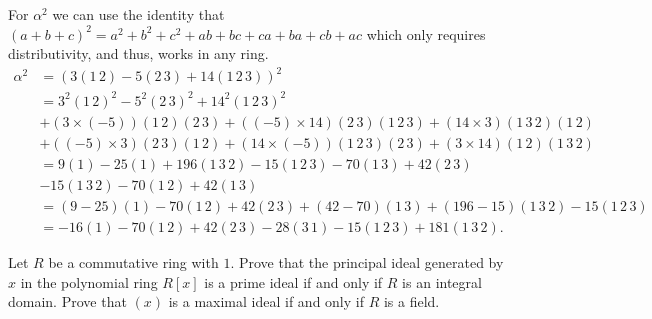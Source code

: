 \documentclass[12 pt, letterpaper]{hmcpset}
\begin{document}
\begin{solution}
\begin{enumerate}
			For $\alpha^{2}$ we can use the identity that $(a + b + c)^{2} = a^{2} + b^{2} + c^{2} + ab + bc + ca + ba + cb + ac$ which only requires distributivity, and thus, works in any ring.
			\[
				\begin{split}
					\alpha^{2} & = (3 (1 \, 2) - 5 (2 \, 3) + 14 (1 \, 2 \, 3))^{2} \\
						   & = 3^{2} (1 \, 2)^{2} - 5^{2} (2 \, 3)^{2} + 14^{2} (1 \, 2 \, 3)^{2} \\ 
						   & + (3 \times (-5))(1 \, 2)(2 \, 3) + ((-5) \times 14) (2 \, 3) (1 \, 2 \, 3) + (14 \times 3) (1 \, 3 \, 2)(1 \, 2) \\
						   & + ((-5) \times 3)(2 \, 3)(1 \, 2) + (14 \times (-5))(1 \, 2 \, 3)(2 \, 3) + (3 \times 14)(1 \, 2)(1 \, 3 \, 2) \\
						   & = 9 (1) - 25 (1) + 196 (1 \, 3 \, 2) - 15 (1 \, 2 \, 3) - 70 (1 \, 3) + 42 (2 \, 3) \\
						   & - 15 (1 \, 3 \, 2) - 70 (1 \, 2) + 42 (1 \, 3) \\
						   & = (9 - 25) (1) - 70 (1 \, 2) + 42(2 \, 3) + (42 - 70) (1 \, 3) + (196 - 15)(1 \, 3 \, 2) - 15 (1 \, 2 \, 3) \\
						   & = -16 (1) - 70 (1 \, 2) + 42 (2 \, 3) - 28 (3 \, 1) -15 (1 \, 2 \, 3) + 181 (1 \, 3 \, 2).
				\end{split}
			\]
	\end{enumerate}
\end{solution}

\pagebreak

\begin{problem}
	Let $R$ be a commutative ring with $1$. Prove that the principal ideal generated by $x$ in the polynomial ring $R[x]$ is a prime ideal if and only if $R$ is an integral domain. Prove that $(x)$ is a maximal ideal if and only if $R$ is a field.
\end{problem}
\end{document}
